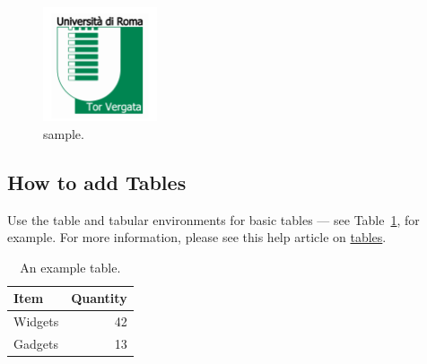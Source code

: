 \begin{figure}[h]
\centering
\includegraphics[width=0.3\textwidth]{image/logouni.png}
\caption{\label{fig:logo}sample.}
\end{figure}

\subsection{How to add Tables}

Use the table and tabular environments for basic tables --- see Table~\cref{tab:widgets}, for example. For more information, please see this help article on \href{https://www.overleaf.com/learn/latex/tables}{tables}. 

\begin{table}[h]
\centering
\begin{tabular}{l|r}
Item & Quantity \\\hline
Widgets & 42 \\
Gadgets & 13
\end{tabular}
\caption{\label{tab:widgets}An example table.}
\end{table}
